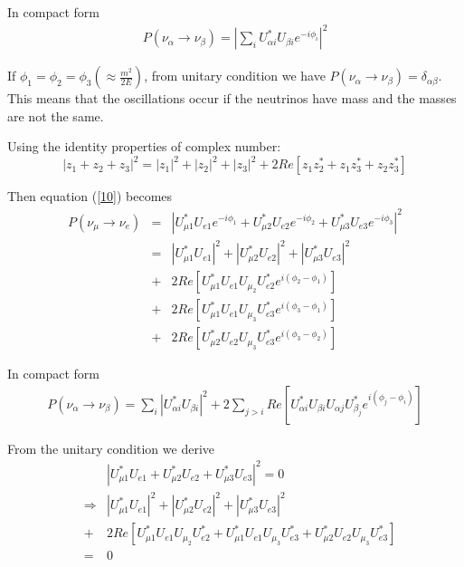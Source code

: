 \documentclass[a4 paper,12pt]{report}%
\begin{document}
In compact form
   \begin{eqnarray}\label{11}
P(\nu_\alpha \rightarrow \nu_\beta) = |\sum_iU^*_{\alpha i}U_{\beta i}e^{-i\phi_i}|^2
   \end{eqnarray} \par
If $\phi_1 = \phi_2 = \phi_3 (\approx \frac{m^2}{2E})$, from unitary condition we have $P(\nu_\alpha \rightarrow \nu_\beta) = \delta_{\alpha\beta}$. This means that the oscillations occur if the neutrinos have mass and the masses are not the same.

Using the identity properties of complex number:
\begin{equation}\label{12}
|z_1+z_2+z_3|^2 = |z_1|^2+|z_2|^2+|z_3|^2+2Re[z_1z_2^*+z_1z_3^*+z_2z_3^*]
\end{equation}\par
Then equation (\ref{10}) becomes
   \begin{eqnarray}\label{13}
 P(\nu_\mu \rightarrow \nu_e) &=& |U^*_{\mu 1}U_{e1}e^{-i\phi_1}+U^*_{\mu 2}U_{e2}e^{-i\phi_2}+U^*_{\mu3}U_{e3}e^{-i\phi_3}|^2\nonumber \\
&=&  |U^*_{\mu 1}U_{e1}|^2 +|U^*_{\mu 2}U_{e2}|^2+|U^*_{\mu3}U_{e3}|^2 \nonumber\\
&+& 2Re[U^*_{\mu 1}U_{e1}U_{\mu_2}U^*_{e2}e^{i(\phi_2-\phi_1)}] \nonumber\\
&+& 2Re[U^*_{\mu 1}U_{e1}U_{\mu_3}U^*_{e3}e^{i(\phi_3-\phi_1)}] \nonumber\\
&+& 2Re[U^*_{\mu 2}U_{e2}U_{\mu_3}U^*_{e3}e^{i(\phi_3-\phi_2)}]
   \end{eqnarray} \par
In compact form
   \begin{eqnarray}\label{14}
P(\nu_\alpha \rightarrow \nu_\beta) = \sum_i|U^*_{\alpha i}U_{\beta i}|^2 + 2\sum_{j>i} Re[U^*_{\alpha i}U_{\beta i}U_{\alpha j}U^*_{\beta_j} e^{i(\phi_j-\phi_i)}]
   \end{eqnarray} \par

From the unitary condition we derive
   \begin{eqnarray}\label{15}
& &|U^*_{\mu 1}U_{e1}+U^*_{\mu 2}U_{e2}+U^*_{\mu3}U_{e3}|^2 = 0\nonumber\\
&\Rightarrow& |U^*_{\mu 1}U_{e1}|^2 +|U^*_{\mu 2}U_{e2}|^2+|U^*_{\mu3}U_{e3}|^2 \nonumber\\
&+& 2Re[U^*_{\mu 1}U_{e1}U_{\mu_2}U^*_{e2}+ U^*_{\mu 1}U_{e1}U_{\mu_3}U^*_{e3}+ U^*_{\mu 2}U_{e2}U_{\mu_3}U^*_{e3}]\nonumber\\
&=& 0
   \end{eqnarray} \par
\end{document}
